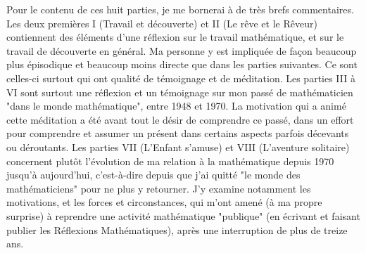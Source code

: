 Pour le contenu de ces huit parties, je me bornerai à de très brefs commentaires. Les deux premières I (Travail et découverte) et II (Le rêve et le Rêveur) contiennent des éléments d'une réflexion sur le travail mathématique, et sur le travail de découverte en général. Ma personne y est impliquée de façon beaucoup plus épisodique et beaucoup moins directe que dans les parties suivantes. Ce sont celles-ci surtout qui ont qualité de témoignage et de méditation. Les parties III à VI sont surtout une réflexion et un témoignage sur mon passé de mathématicien "dans le monde mathématique", entre 1948 et 1970. La motivation qui a animé cette méditation a été avant tout le désir de comprendre ce passé, dans un effort pour comprendre et assumer un présent dans certains aspects parfois décevants ou déroutants. Les parties VII (L'Enfant s'amuse) et VIII (L'aventure solitaire) concernent plutôt l'évolution de ma relation à la mathématique depuis 1970 jusqu'à aujourd'hui, c'est-à-dire depuis que j'ai quitté "le monde des mathématiciens" pour ne plus y retourner. J'y examine notamment les motivations, et les forces et circonstances, qui m'ont amené (à ma propre surprise) à reprendre une activité mathématique "publique" (en écrivant et faisant publier les Réflexions Mathématiques), après une interruption de plus de treize ans.



